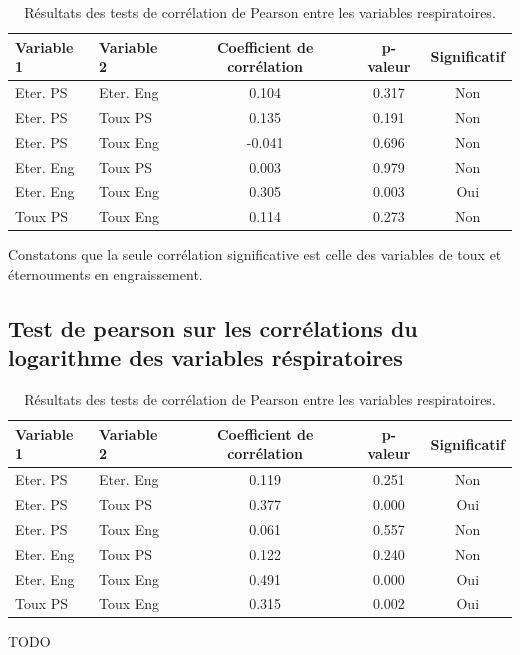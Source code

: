 \documentclass{article}
\begin{document}
\begin{table}[ht]
    \centering
    \begin{tabular}{llccc}
    \toprule
    \textbf{Variable 1} & \textbf{Variable 2} & \textbf{Coefficient de corrélation} & \textbf{p-valeur} & \textbf{Significatif} \\
    \midrule
    Eter. PS & Eter. Eng & 0.104 & 0.317 & Non \\
    Eter. PS & Toux PS & 0.135 & 0.191 & Non \\
    Eter. PS & Toux Eng & -0.041 & 0.696 & Non \\
    Eter. Eng & Toux PS & 0.003 & 0.979 & Non \\
    Eter. Eng & Toux Eng & 0.305 & 0.003 & Oui \\
    Toux PS & Toux Eng & 0.114 & 0.273 & Non \\
    \bottomrule
    \end{tabular}
    \caption{Résultats des tests de corrélation de Pearson entre les variables respiratoires.}\label{tab:correlation_results}
\end{table}
Constatons que la seule corrélation significative est celle des variables de toux et éternouments en engraissement. 
\subsection{Test de pearson sur les corrélations du logarithme des variables réspiratoires}\label{annexe:pearson_log}
\begin{table}[ht]
    \centering
    \begin{tabular}{llccc}
    \toprule
    \textbf{Variable 1} & \textbf{Variable 2} & \textbf{Coefficient de corrélation} & \textbf{p-valeur} & \textbf{Significatif} \\
    \midrule
    Eter. PS & Eter. Eng & 0.119 & 0.251 & Non \\
    Eter. PS & Toux PS & 0.377 & 0.000 & Oui \\
    Eter. PS & Toux Eng & 0.061 & 0.557 & Non \\
    Eter. Eng & Toux PS & 0.122 & 0.240 & Non \\
    Eter. Eng & Toux Eng & 0.491 & 0.000 & Oui \\
    Toux PS & Toux Eng & 0.315 & 0.002 & Oui \\
    \bottomrule
    \end{tabular}
    \caption{Résultats des tests de corrélation de Pearson entre les variables respiratoires.}\label{tab:correlation_log_results}
\end{table}
TODO
\end{document}
